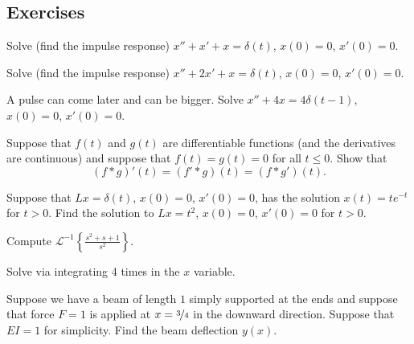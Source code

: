 \subsection{Exercises}

\begin{exercise}
Solve (find the impulse response)
$x'' + x' + x = \delta(t)$, $x(0) = 0$, $x'(0)=0$.
\end{exercise}

\begin{exercise}
Solve (find the impulse response)
$x'' + 2 x' + x = \delta(t)$, $x(0) = 0$, $x'(0)=0$.
\end{exercise}

\begin{exercise}
A pulse can come later and can be bigger.
Solve 
$x'' + 4 x = 4\delta(t-1)$, $x(0) = 0$, $x'(0)=0$.
\end{exercise}

\begin{exercise}
Suppose that $f(t)$ and $g(t)$ are differentiable functions
(and the derivatives are continuous)
and suppose that $f(t) = g(t) = 0$ for all $t \leq 0$.  Show that
\begin{equation*}
(f * g)'(t) = (f' * g)(t) = (f * g')(t) .
\end{equation*}
\end{exercise}

\begin{exercise}
Suppose that $L x = \delta(t)$, $x(0) = 0$, $x'(0) = 0$, has the solution
$x(t) = t e^{-t}$ for $t > 0$.  Find the solution to
$Lx = t^2$, $x(0) = 0$, $x'(0) = 0$ for $t > 0$.
\end{exercise}

\begin{exercise}
Compute
${\mathcal{L}}^{-1} \left\{ \frac{s^2+s+1}{s^2} \right\}$.
\end{exercise}

\begin{exercise}[challenging]
Solve  via integrating 4 times in the $x$ variable.
\end{exercise}

\begin{exercise}
Suppose we have a beam of length $1$ simply supported at the ends and
suppose that force $F=1$ is applied at $x=\nicefrac{3}{4}$ in the downward
direction.  Suppose that $EI=1$ for simplicity.  Find the beam deflection
$y(x)$.
\end{exercise}

